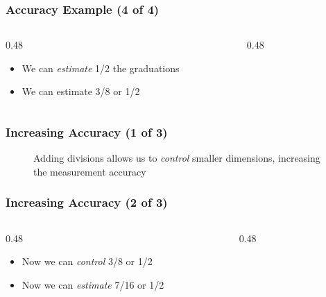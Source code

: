 \begin{frame}
	\frametitle{Accuracy Example (4 of 4)}

    \begin{columns}
        \begin{column}{0.48\linewidth}
            \begin{itemize}
                \item We can \emph{estimate} 1/2 the graduations
                \item We can estimate 3/8 or 1/2
            \end{itemize}
        \end{column}
        \begin{column}{0.48\linewidth}
            \begin{figure}
                \centering
                \resizebox{\columnwidth}{!}{
                       
                }
            \end{figure}  
        \end{column}
    \end{columns}          
\end{frame}

\begin{frame}
	\frametitle{Increasing Accuracy (1 of 3)}
        \begin{figure}
            \centering
            \resizebox{\columnwidth}{!}{
                
            }
        {\footnotesize Adding divisions allows us to \emph{control} smaller dimensions, increasing the measurement accuracy\par}
        \end{figure}        
\end{frame}

\begin{frame}
	\frametitle{Increasing Accuracy (2 of 3)}

    \begin{columns}
        \begin{column}{0.48\linewidth}
            \begin{itemize}
                \item Now we can \emph{control} 3/8 or 1/2
                \item Now we can \emph{estimate} 7/16 or 1/2
            \end{itemize}
        \end{column}
        \begin{column}{0.48\linewidth}
            \begin{figure}
                \centering
                \resizebox{\columnwidth}{!}{
                    
                }
            \end{figure}  
        \end{column}
    \end{columns}          
\end{frame}


